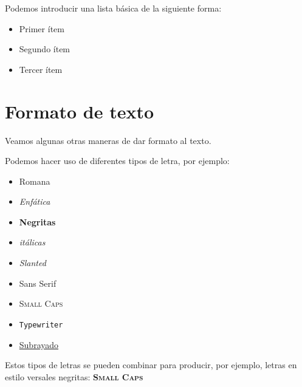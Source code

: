 \documentclass[letterpaper,11pt]{article}
\begin{document}
Podemos introducir una lista básica de la siguiente forma:

\begin{itemize}
\item Primer ítem
\item Segundo ítem
\item Tercer ítem
\end{itemize}

\section{Formato de texto}


Veamos algunas otras maneras de dar formato al texto.

Podemos hacer uso de diferentes tipos de letra, por ejemplo:

\begin{itemize}
\item \textrm{Romana}

\item \emph{Enfática}

\item \textbf{Negritas}

\item \textit{itálicas}

\item \textsl{Slanted}

\item \textsf{Sans Serif}

\item \textsc{Small Caps}

\item \texttt{Typewriter}

\item \underline{Subrayado}

\end{itemize}

Estos tipos de letras se pueden combinar para producir, por ejemplo, letras en estilo versales negritas: \textbf{\textsc{Small Caps}}

\end{document}
